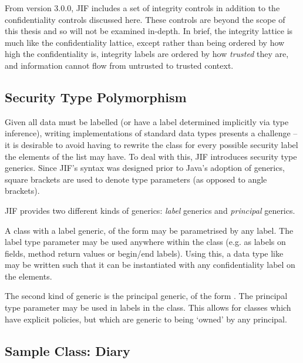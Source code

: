 From version 3.0.0, JIF includes a set of integrity controls in addition to the confidentiality controls discussed here. These controls are beyond the scope of this thesis and so will not be examined in-depth. In brief, the integrity lattice is much like the confidentiality lattice, except rather than being ordered by how high the confidentiality is, integrity labels are ordered by how \textit{trusted} they are, and information cannot flow from untrusted to trusted context.

\subsection{Security Type Polymorphism}

Given all data must be labelled (or have a label determined implicitly via type inference), writing implementations of standard data types presents a challenge -- it is desirable to avoid having to rewrite the  class for every possible security label the elements of the list may have. To deal with this, JIF introduces security type generics. Since JIF's syntax was designed prior to Java's adoption of generics, square brackets are used to denote type parameters (as opposed to angle brackets).

JIF provides two different kinds of generics: \textit{label} generics and \textit{principal} generics.

A class with a label generic, of the form  may be parametrised by any label. The label type parameter may be used anywhere within the class (e.g. as labels on fields, method return values or begin/end labels). Using this, a data type like  may be written such that it can be instantiated with any confidentiality label on the elements.

The second kind of generic is the principal generic, of the form . The principal type parameter may be used in labels in the class. This allows for classes which have explicit policies, but which are generic to being `owned' by any principal.

\newpage

\subsection{Sample Class: Diary} \label{jif_bg_sample_diary}

\inputminted{java}{content/code_sections/jif_para_bg/Diary.jif}

